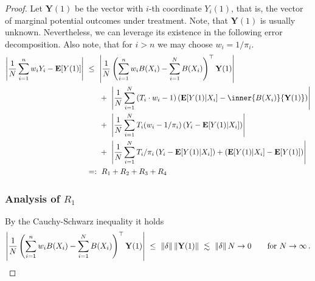 \begin{proof}
  Let
  $
    \mathbf{Y}(1)
  $
  be the vector with $i$-th coordinate
  $
  Y_i(1)
  $,
  that is, the vector of marginal potential outcomes under treatment.
  Note, that $\mathbf{Y}(1)$ is usually unknown. Nevertheless, we can leverage its existence in the following error decomposition.
  Also note, that for $i>n$ we may choose $w_i=1/\pi_i$.
\begin{align*}
  \left| 
    \frac{1}{N}
    \sum_{i=1}^{n} 
    w_i
    Y_i
    -
    \E[Y(1)]
  \right|
  &
  \ 
  \le
  \ 
  \left|  
  \frac{1}{N}
  \left( 
    \sum_{i=1}^{n} 
    w_i
    B(X_i)
    -
    \sum_{i=1}^{N} 
    B(X_i)
  \right)
  ^\top
     \mathbf{Y}(1) 
  \right|
  \\
  &
  \qquad
  +
  \ 
  \left|  
  \frac{1}{N}
    \sum_{i=1}^{N} 
    \left( T_i\cdot w_i -1 \right)
    \left( 
    \E[Y(1)| X_i]
    -
    \inner
    {B(X_i)}
    { \mathbf{Y}(1) }
    \right)
  \right|
  \\
  &
  \qquad
  +
  \ 
  \left|  
  \frac{1}{N}
    \sum_{i=1}^{N} 
    T_i
    (
    w_i 
    -
    1/\pi_i
    )
    \left( 
      Y_i
    -
    \E[Y(1)| X_i]
    \right)
  \right|
  \\
  &
  \qquad
  +
  \ 
  \left|  
  \frac{1}{N}
    \sum_{i=1}^{N} 
    T_i
    /\pi_i
    \left( 
      Y_i
    -
    \E[Y(1)| X_i]
    \right)
    +
    \left( 
    \E[Y(1)| X_i]
    -
    \E[Y(1)]
    \right)
  \right|
  \\
  &
  \ 
  =:
  \ 
  R_1
  +
  R_2
  +
  R_3
  +
  R_4
  \end{align*}
  \subsubsection*{Analysis of $R_1$}
  By the Cauchy-Schwarz inequality it holds
  \begin{align*}
   \left|  
  \frac{1}{N}
  \left( 
    \sum_{i=1}^{n} 
    w_i
    B(X_i)
    -
    \sum_{i=1}^{N} 
    B(X_i)
  \right)
  ^\top
     \mathbf{Y}(1) 
  \right|
    \ 
  \le
    \ 
  \norm{\delta}
  \norm{
     \mathbf{Y}(1) 
  }
  \ 
  \lesssim 
  \ 
  \norm{\delta}
  N
  \to
  0
  \qquad
  \text{for}\ 
  N\to \infty
  \,.
  \end{align*}

\end{proof}
